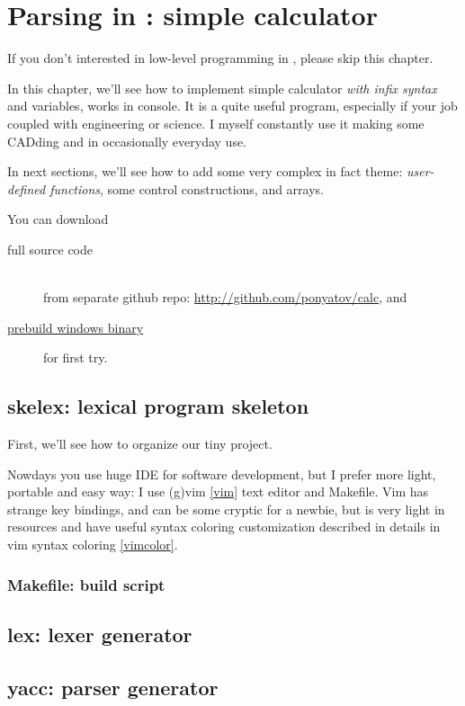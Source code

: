 \chapter{Parsing in \cpp: simple calculator}\clearpage

If you don't interested in low-level programming in \cpp, please skip this
chapter.
\bigskip

In this chapter, we'll see how to implement simple calculator \textit{with infix
syntax} and variables, works in console. It is a quite useful program,
especially if your job coupled with engineering or science. I myself constantly
use it making some CADding and in occasionally everyday use.

In next sections, we'll see how to add some very complex in fact theme:
\emph{user-defined functions}, some control constructions, and arrays.

\bigskip
You can download
\begin{description}
\item[full source code]\ \\ from separate github repo:
\url{http://github.com/ponyatov/calc}, and
\item[\href{http://github.com/ponyatov/calc/releases/latest}{prebuild windows
binary}] for first try.
\end{description}

\section{skelex: lexical program skeleton}

First, we'll see how to organize our tiny project.
\bigskip

Nowdays you use huge IDE for
software development, but I prefer more light, portable and easy way: I use
(g)vim \ref{vim} text editor and Makefile. Vim has strange key bindings, and can be some cryptic for a newbie, but
is very light in resources and have useful syntax coloring customization described in
details in vim syntax coloring \ref{vimcolor}.



\subsection{Makefile: build script}

\section{lex: lexer generator}

\section{yacc: parser generator}
